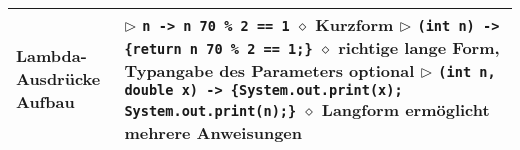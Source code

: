 \begin{longtable}{ | p{} p{} | }
    \makecell[l]{Lambda-Ausdrücke \\ Aufbau} & \makecell[l]{
    $\triangleright$ \texttt{n -> n \SI{70}{\percent} 2 == 1} \\
    \hspace{0.4cm} $\diamond$ Kurzform  \\
    $\triangleright$ \texttt{(int n) ->\{return n \SI{70}{\percent} 2 == 1;\}} \\
    \hspace{0.4cm} $\diamond$ richtige lange Form, Typangabe des Parameters optional \\
    $\triangleright$ \texttt{(int n, double x) -> \{System.out.print(x); System.out.print(n);\}} \\
    \hspace{0.4cm} $\diamond$ Langform ermöglicht mehrere Anweisungen } \\ \hline


\end{longtable}
